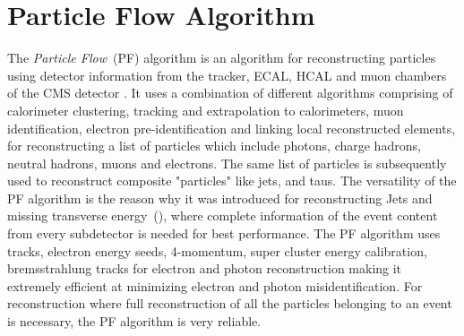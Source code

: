 \section{Particle Flow Algorithm}
The \textit{Particle Flow}~(PF) algorithm is an algorithm for reconstructing particles using detector information from the tracker, ECAL, HCAL and muon chambers of the CMS detector \cite{PFALGO,PF}.
It uses a combination of different algorithms comprising of calorimeter clustering, tracking and extrapolation to calorimeters, muon identification, electron pre-identification and linking local reconstructed elements, for reconstructing a list of particles which include photons, charge hadrons, neutral hadrons, muons and electrons. The same list of particles is subsequently used to reconstruct composite "particles" like jets, \MET and taus. The versatility of the PF algorithm is the reason why it was introduced for reconstructing Jets and missing transverse energy~(\MET), where complete information of the event content from every subdetector is needed for best performance. The PF algorithm uses tracks, electron energy seeds, 4-momentum, super cluster energy calibration, bremsstrahlung tracks for electron and photon reconstruction making it extremely efficient at minimizing electron and photon misidentification.
For \MET reconstruction where full reconstruction of all the particles belonging to an event is necessary, the PF algorithm is very reliable. 
